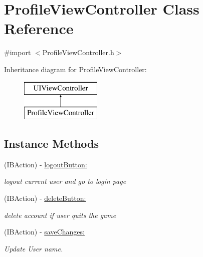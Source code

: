 \hypertarget{interface_profile_view_controller}{}\section{Profile\+View\+Controller Class Reference}
\label{interface_profile_view_controller}


{\ttfamily \#import $<$Profile\+View\+Controller.\+h$>$}

Inheritance diagram for Profile\+View\+Controller\+:\begin{figure}[H]
\begin{center}
\leavevmode
\includegraphics[height=2.000000cm]{interface_profile_view_controller}
\end{center}
\end{figure}
\subsection*{Instance Methods}
\begin{DoxyCompactItemize}
\item 
(I\+B\+Action) -\/ \hyperlink{interface_profile_view_controller_ae8913f870cd838fba199dc5fd0b29c20}{logout\+Button\+:}
\begin{DoxyCompactList}\small\item\em logout current user and go to login page \end{DoxyCompactList}\item 
(I\+B\+Action) -\/ \hyperlink{interface_profile_view_controller_afa732a1eb48ae47a04a2c9fafe04c0f4}{delete\+Button\+:}
\begin{DoxyCompactList}\small\item\em delete account if user quits the game \end{DoxyCompactList}\item 
(I\+B\+Action) -\/ \hyperlink{interface_profile_view_controller_a993b703b9f7e2dc600ece83ead5b7782}{save\+Changes\+:}
\begin{DoxyCompactList}\small\item\em Update User name. \end{DoxyCompactList}\end{DoxyCompactItemize}
